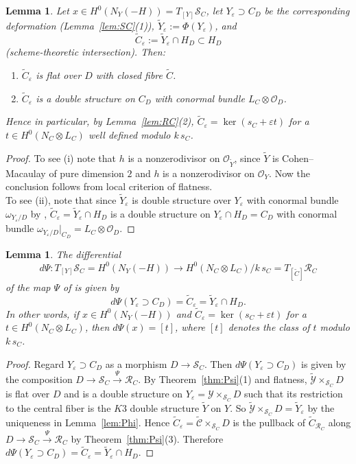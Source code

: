 \documentclass[11pt,twoside]{amsart}
\theoremstyle{plain}
\newtheorem{lemma}[theorem]{Lemma}
\theoremstyle{definition}
\newcommand{\OO}{\mathcal{O}}
\newcommand{\Yt}{\widetilde{Y}}
\newcommand{\Ct}{\widetilde{C}}
\newcommand{\NY}{N_{Y}}
\newcommand{\SC}{\mathcal{S}_C}
\newcommand{\RC}{\mathcal{R}_C}
\newcommand{\Dd}{D}
\newcommand{\cY}{\mathcal{Y}}
\newcommand{\cYt}{\widetilde{\mathcal{Y}}}
\newcommand{\cCt}{\widetilde{\mathcal{C}}}
\begin{document}
\begin{lemma}\label{def:Psi}
Let $x\in H^0(\NY(-H))=T_{[Y]}\SC$, let $Y_\varepsilon\supset C_\Dd$ be the corresponding deformation (Lemma~\ref{lem:SC}(1)), $\Yt_\varepsilon:=\Phi(Y_\varepsilon)$, and
\[
\Ct_\varepsilon:=\Yt_\varepsilon\cap H_\Dd\subset H_\Dd
\]
(scheme-theoretic intersection). Then:
\begin{enumerate}
\item[(i)] $\Ct_\varepsilon$ is flat over $\Dd$ with closed fibre $\Ct$. 
\item[(ii)] $\Ct_\varepsilon$ is a double structure on $C_\Dd$ with conormal bundle $L_C\otimes\OO_\Dd$. 
\end{enumerate}
Hence in particular, by Lemma~\ref{lem:RC}(2), $\Ct_\varepsilon=\ker(s_C+\varepsilon t)$ for a $t\in H^0(N_C\otimes L_C)$ well defined modulo $k\,s_C$.
\end{lemma}

\begin{proof}
To see (i) note that $h$ is a nonzerodivisor on $\OO_{\Yt}$, since $\Yt$ is Cohen--Macaulay of pure dimension $2$ and $h$ is a nonzerodivisor on $\OO_{Y}$. Now the conclusion follows from local criterion of flatness. \\
To see (ii), note that since $\widetilde Y_{\varepsilon}$ is double structure over $Y_{\varepsilon}$ with conormal bundle $\omega_{Y_{\varepsilon}/D}$ by , $\widetilde C_{\varepsilon} = \widetilde Y_{\varepsilon} \cap H_D$ is a double structure on $Y_{\varepsilon} \cap H_D = C_D$ with conormal bundle $\omega_{Y_{\varepsilon}/D}|_{C_D} = L_C \otimes \mathcal O_D$. 
\end{proof}

\begin{lemma}\label{lem:dPsi}
The differential
\[
d\Psi\colon T_{[Y]}\SC=H^0(\NY(-H))\longrightarrow H^0(N_C\otimes L_C)/k\,s_C=T_{[\Ct]}\RC
\]
of the map $\Psi$ of  is given by
\[
d\Psi(Y_\varepsilon\supset C_\Dd)=\Ct_\varepsilon=\Yt_\varepsilon\cap H_\Dd .
\]
In other words, if $x\in H^0(\NY(-H))$ and $\Ct_\varepsilon=\ker(s_C+\varepsilon t)$ for a $t\in H^0(N_C\otimes L_C)$, then $d\Psi(x)=[t]$, where $[t]$ denotes the class of $t$ modulo $k\,s_C$.
\end{lemma}

\begin{proof}
 Regard $Y_\varepsilon \supset C_D$ as a morphism $\Dd\to\SC$. Then $d\Psi(Y_\varepsilon \supset C_D)$ is given by the composition $D \to \mathcal{S}_C \xrightarrow{\Psi} \mathcal{R}_C$. By Theorem~\ref{thm:Psi}(1) and flatness, $\cYt\times_{\SC}\Dd$ is flat over $\Dd$ and is a double structure on $Y_\varepsilon=\cY\times_{\SC}\Dd$ such that its restriction to the central fiber is the $K3$ double structure $\widetilde Y $ on $Y$. So
 $\cYt\times_{\SC}\Dd=\Yt_\varepsilon$ by the uniqueness in Lemma~\ref{lem:Phi}. Hence $\Ct_\varepsilon=\cCt\times_{\SC}\Dd$ is the pullback of $\Ct_{\RC}$ along $D \to \mathcal{S}_C \xrightarrow{\Psi} \mathcal{R}_C$ by Theorem~\ref{thm:Psi}(3). Therefore $d\Psi(Y_\varepsilon\supset C_\Dd)=\Ct_\varepsilon=\Yt_\varepsilon\cap H_\Dd$. 
\end{proof}
\end{document}
